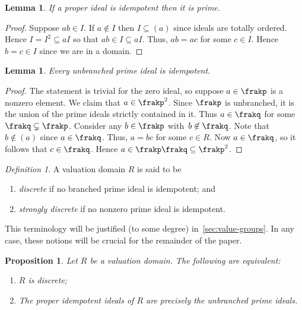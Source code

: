 \documentclass{amsart}
\numberwithin{equation}{section}%
\newtheorem{Prop}[equation]{Proposition}
\newtheorem{Lem}[equation]{Lemma}
\theoremstyle{remark}
\newtheorem{Def}[equation]{Definition}
\newcounter{enum-resume-hack}
\begin{document}
\begin{Lem}\label{lem:idempotent-is-prime}
	If a proper ideal is idempotent then it is prime.
\end{Lem}

\begin{proof}
	Suppose $ab \in I$. If $a \not\in I$ then $I \subseteq (a)$ since ideals are totally ordered. Hence $I=I^2 \subseteq aI$ so that $ab \in I \subseteq aI$. Thus, $ab=ac$ for some $c \in I$. Hence $b=c \in I$ since we are in a domain.
\end{proof}

\begin{Lem}\label{lem:unbranched-is-idempotent}
	Every unbranched prime ideal is idempotent.
\end{Lem}

\begin{proof}
	The statement is trivial for the zero ideal, so suppose $a \in \frakp$ is a nonzero element. We claim that $a \in \frakp^2$. Since $\frakp$ is unbranched, it is the union of the prime ideals strictly contained in it. Thus $a \in \frakq$ for some $\frakq \subsetneq \frakp$. Consider any $b \in \frakp$ with~$b \not\in \frakq$. Note that $b \not\in (a)$ since $a \in \frakq$. Thus, $a=bc$ for some $c \in R$. Now $a \in \frakq$, so it follows that $c \in \frakq$. Hence $a\in \frakp\frakq \subseteq \frakp^2$.
\end{proof}

\begin{Def}\label{def:discrete}
	A valuation domain $R$ is said to be
	\begin{enumerate}
		\item \emph{discrete} if no branched prime ideal is idempotent; and
		\item \emph{strongly discrete} if no nonzero prime ideal is idempotent.
	\end{enumerate}
	This terminology will be justified (to some degree) in~\cref{sec:value-groups}. In any case, these notions will be crucial for the remainder of the paper.
\end{Def}

\begin{Prop}\label{prop:discrete-chars} 
	Let $R$ be a valuation domain. The following are equivalent:
	\begin{enumerate}
		\item $R$ is discrete;
		\item The proper idempotent ideals of $R$ are precisely the unbranched prime ideals.
	\end{enumerate}
\end{Prop}
\end{document}
